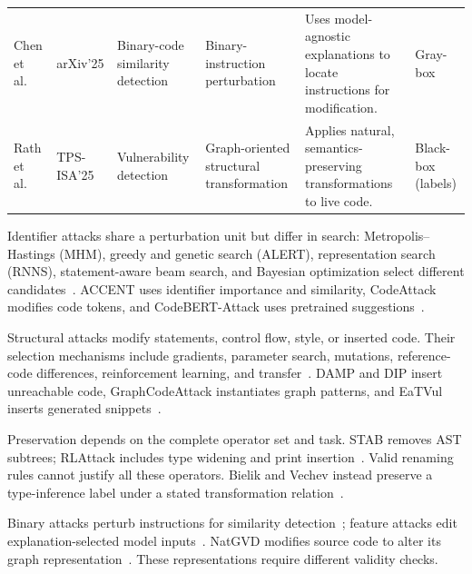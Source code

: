 \documentclass[acmsmall,screen,review,nonacm]{acmart}
\begin{document}
{\begin{longtable}{@{}L{2.1cm}L{1.5cm}L{2.30cm}L{2.50cm}L{3.50cm}L{1.35cm}@{}}
Chen et al.~\cite{explainerbcsd2025} &
arXiv'25 &
Binary-code similarity detection &
Binary-instruction perturbation &
Uses model-agnostic explanations to locate instructions for modification. &
Gray-box \\

Rath et al.~\cite{natgvd2025} &
TPS-ISA'25 &
Vulnerability detection &
Graph-oriented structural transformation &
Applies natural, semantics-preserving transformations to live code. &
Black-box (labels) \\

\end{longtable}
}

Identifier attacks share a perturbation unit but differ in search: Metropolis--Hastings (MHM), greedy and genetic search (ALERT), representation search (RNNS), statement-aware beam search, and Bayesian optimization select different candidates~\cite{zhang2020generating,yang2022natural,zhang2023rnns,gu2023beamattack,huang2025iterative}. ACCENT uses identifier importance and similarity, CodeAttack modifies code tokens, and CodeBERT-Attack uses pretrained suggestions~\cite{zhou2022accent,jha2023codeattack,codebertattack2024}.

Structural attacks modify statements, control flow, style, or inserted code. Their selection mechanisms include gradients, parameter search, mutations, reference-code differences, reinforcement learning, and transfer~\cite{srikant2021generating,ramakrishnan2022semantic,zhang2022carrot,vahdatpour2021search,tian2023coda,rlattack2024,transfer2024coding}. DAMP and DIP insert unreachable code, GraphCodeAttack instantiates graph patterns, and EaTVul inserts generated snippets~\cite{yefet2020adversarial,na2023dip,nguyen2023graphcodeattack,liu2024eatvul}.

Preservation depends on the complete operator set and task. STAB removes AST subtrees; RLAttack includes type widening and print insertion~\cite{chen2023structure,rlattack2024}. Valid renaming rules cannot justify all these operators. Bielik and Vechev instead preserve a type-inference label under a stated transformation relation~\cite{bielik2020adversarial}.

Binary attacks perturb instructions for similarity detection~\cite{funcfooler2022,spatialgreedy2024,explainerbcsd2025}; feature attacks edit explanation-selected model inputs~\cite{explainability2025}. NatGVD modifies source code to alter its graph representation~\cite{natgvd2025}. These representations require different validity checks.
\end{document}
